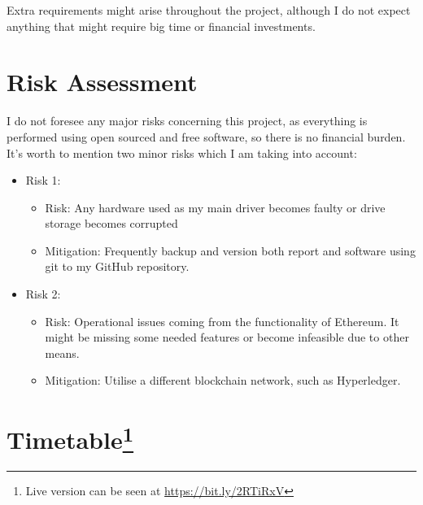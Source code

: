 \documentclass[a4paper,12pt]{article}
\begin{document}
Extra requirements might arise throughout the project, although I do not expect anything that might require big time or financial investments.

\section*{Risk Assessment}

I do not foresee any major risks concerning this project, as everything is performed using open sourced and free software, so there is no financial burden. It's worth to mention two minor risks which I am taking into account:
\begin{itemize}
  \item Risk 1:
    \begin{itemize}
      \item Risk: Any hardware used as my main driver becomes faulty or drive storage becomes corrupted  
      \item Mitigation: Frequently backup and version both report and software using git to my GitHub repository.
    \end{itemize}
  \item Risk 2:
    \begin{itemize}
      \item Risk: Operational issues coming from the functionality of Ethereum. It might be missing some needed features or become infeasible due to other means.
      \item Mitigation: Utilise a different blockchain network, such as Hyperledger.
    \end{itemize}
\end{itemize}

\section*{Timetable\footnote{Live version can be seen at \url{https://bit.ly/2RTiRxV}}}

\begin{figure}[ht]
  \centering
\end{figure}
\pagebreak


\end{document}
